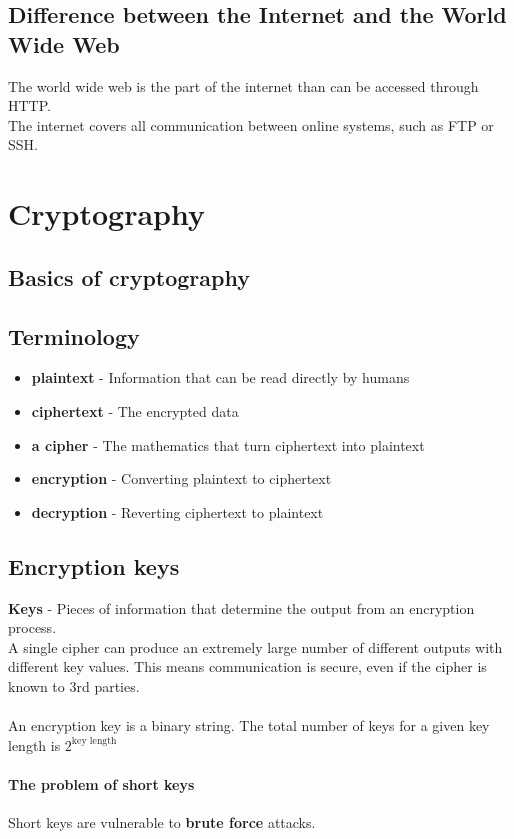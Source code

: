 \documentclass{article}[18pt]
\begin{document}
\subsection{Difference between the Internet and the World Wide Web}
The world wide web is the part of the internet than can be accessed through HTTP.\\
The internet covers all communication between online systems, such as FTP or SSH.\\
\section{Cryptography}
\subsection{Basics of cryptography}
\subsection{Terminology}
\begin{itemize}
\item \textbf{plaintext} - Information that can be read directly by humans
\item \textbf{ciphertext} - The encrypted data
\item \textbf{a cipher} - The mathematics that turn ciphertext into plaintext
\item \textbf{encryption} - Converting plaintext to ciphertext
\item \textbf{decryption} - Reverting ciphertext to plaintext
\end{itemize}
\subsection{Encryption keys}
\textbf{Keys} - Pieces of information that determine the output from an encryption process.\\
A single cipher can produce an extremely large number of different outputs with different key values. This means communication is secure, even if the cipher is known to 3rd parties.\\
\\
An encryption key is a binary string. The total number of keys for a given key length is $2^{\text{key length}}$
\paragraph{The problem of short keys}
Short keys are vulnerable to \textbf{brute force} attacks.
\end{document}
